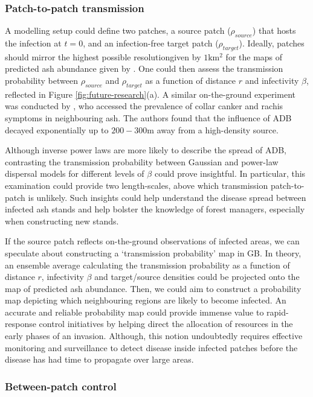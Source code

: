 \subsubsection{Patch-to-patch transmission}
A modelling setup could define two patches, a source patch ($\rho_{source}$) that hosts the infection at $t=0$, and an infection-free target patch ($\rho_{target}$). Ideally, patches should mirror the highest possible resolution\textemdash given by $1\mathrm{km^2}$ for the maps of predicted ash abundance given by \cite{hill.data}.
One could then assess the transmission probability between $\rho_{source}$ and $\rho_{target}$ as a function of distance $r$ and infectivity $\beta$, reflected in Figure \ref{fig:future-research}(a). 
A similar on-the-ground experiment was conducted by \cite{https://doi.org/10.1111/1365-2745.13383},
who accessed the prevalence of collar canker and rachis symptoms in neighbouring ash. 
The authors found that the influence of ADB decayed exponentially up to $200-300\mathrm{m}$ away from a high-density source.

Although inverse power laws are more likely to describe the spread of ADB, contrasting the transmission probability between Gaussian and power-law dispersal models for different levels of $\beta$ could prove insightful. In particular, this examination could provide two length-scales, above which transmission patch-to-patch is unlikely.  Such insights could help understand the disease spread between infected ash stands and help bolster the knowledge of forest managers, especially when constructing new stands.

If the source patch reflects on-the-ground observations of infected areas, we can speculate about constructing a `transmission probability' map in GB. In theory, an ensemble average calculating the transmission probability as a function of distance $r$, infectivity $\beta$ and target/source densities could be projected onto the map of predicted ash abundance.
Then, we could aim to construct a probability map depicting which neighbouring regions are likely to become infected. An accurate and reliable probability map could provide immense value to rapid-response control initiatives by helping direct the allocation of resources in the early phases of an invasion. 
Although, this notion undoubtedly requires effective monitoring and surveillance to detect disease inside infected patches before the disease has had time to propagate over large areas.

\subsubsection{Between-patch control}

